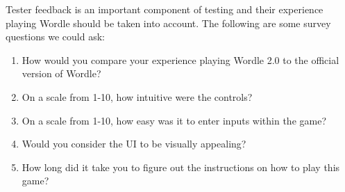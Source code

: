 \documentclass[12pt, titlepage]{article}
\begin{document}
Tester feedback is an important component of testing and their experience playing Wordle should be taken into account. The following are some survey questions we could ask:
\begin{enumerate}
    \item How would you compare your experience playing Wordle 2.0 to the official version of Wordle?
    \item On a scale from 1-10, how intuitive were the controls?
    \item On a scale from 1-10, how easy was it to enter inputs within the game?
    \item Would you consider the UI to be visually appealing?
    \item How long did it take you to figure out the instructions on how to play this game?
\end{enumerate}
\end{document}
